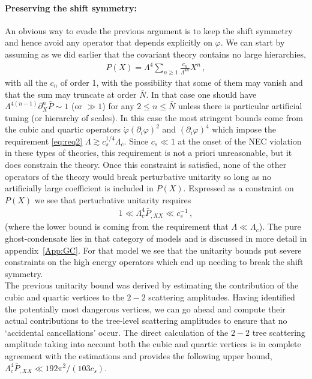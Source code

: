 \documentclass[12pt]{article}
\def\ba{\begin{eqnarray}}
\def\ea{\end{eqnarray}}
\def\p{\partial}
\def\p{\partial}
\begin{document}
\paragraph{Preserving the shift symmetry: } An obvious way to evade the previous argument is to keep the shift symmetry and hence avoid any operator that depends explicitly on $\varphi$. We can start by assuming as we did earlier  that the covariant theory contains no large hierarchies,
\ba
\label{eq:OneScalePX}
P(X)=\Lambda^4\sum_{n\ge 1} \frac{c_{n}}{\Lambda^{4n}} X^n\,,
\ea
with all the $c_n$ of order 1, with the possibility that some of them may vanish and that the sum may truncate at order $\bar N$. In that case one should have  $\Lambda^{4(n-1)}\p_X^n \bar P \sim  1$ (or $\gg 1$)  for any $2\le n\le \bar N$ unless there is particular artificial tuning (or hierarchy of scales). In this case the most stringent bounds come from the cubic and quartic operators $\dot \varphi (\p_i \varphi)^2$ and $(\p_i \varphi)^4$ which impose the requirement \eqref{eq:req2} $\Lambda\gtrsim c_s^{1/4} \Lambda_c$.
Since $c_s\ll 1$ at the onset of the NEC violation in these types of theories, this requirement is not a priori unreasonable, but it does constrain the theory.  Once this constraint is satisfied, none of the other operators  of the theory would break perturbative unitarity so long as no artificially large coefficient is included in $P(X)$. Expressed as a constraint on $P(X)$ we see that perturbative unitarity requires
\ba
1\ll \Lambda_c^4 \bar P_{,XX} \ll  c_s^{-1}\,,
\label{eq:PXX}
\ea
(where the lower bound is coming from the requirement that $\Lambda \ll \Lambda_c$). The pure ghost-condensate \cite{ArkaniHamed:2003uy,Creminelli:2006xe,Buchbinder:2007ad,Koehn:2015vvy} lies in that category of models and is discussed in more detail in appendix~\ref{App:GC}. For that model we see that the unitarity bounds put severe constraints on the high energy operators which end up needing to break the shift symmetry.  \\

The previous unitarity bound was derived by estimating the contribution of the cubic and quartic vertices to the $2-2$ scattering amplitudes. Having identified the potentially most dangerous vertices, we can go ahead and compute their actual contributions to the tree-level scattering amplitudes to ensure that no `accidental cancellations' occur. The direct calculation of the $2-2$ tree scattering amplitude taking into account both the cubic and quartic vertices is in complete agreement with the estimations and provides the following upper bound,  $ \Lambda_c^4 \bar P_{,XX} \ll 192 \pi^2/(103  c_s)$.  \\
\end{document}
